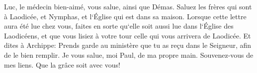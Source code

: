 \verse Luc, le médecin bien-aimé, vous salue, ainsi que Démas. 
\verse Saluez les frères qui sont à Laodicée, et Nymphas, et l`Église qui est dans sa maison. 
\verse Lorsque cette lettre aura été lue chez vous, faites en sorte qu`elle soit aussi lue dans l`Église des Laodicéens, et que vous lisiez à votre tour celle qui vous arrivera de Laodicée. 
\verse Et dites à Archippe: Prends garde au ministère que tu as reçu dans le Seigneur, afin de le bien remplir. 
\verse Je vous salue, moi Paul, de ma propre main. Souvenez-vous de mes liens. Que la grâce soit avec vous! 
